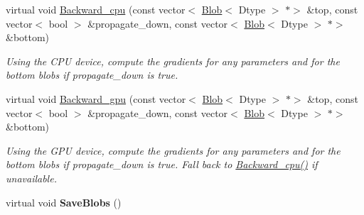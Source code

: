\begin{DoxyCompactItemize}
\mbox{\label{classcaffe_1_1_h_d_f5_output_layer_a43fe8d2ba8baf951c4be596b046ee29f}} 
virtual void \mbox{\hyperlink{classcaffe_1_1_h_d_f5_output_layer_a43fe8d2ba8baf951c4be596b046ee29f}{Backward\+\_\+cpu}} (const vector$<$ \mbox{\hyperlink{classcaffe_1_1_blob}{Blob}}$<$ Dtype $>$ $\ast$$>$ \&top, const vector$<$ bool $>$ \&propagate\+\_\+down, const vector$<$ \mbox{\hyperlink{classcaffe_1_1_blob}{Blob}}$<$ Dtype $>$ $\ast$$>$ \&bottom)
\begin{DoxyCompactList}\small\item\em Using the C\+PU device, compute the gradients for any parameters and for the bottom blobs if propagate\+\_\+down is true. \end{DoxyCompactList}\item 
\mbox{\label{classcaffe_1_1_h_d_f5_output_layer_a7b6f29bc5aaaf64bf90206c01f34ac4f}} 
virtual void \mbox{\hyperlink{classcaffe_1_1_h_d_f5_output_layer_a7b6f29bc5aaaf64bf90206c01f34ac4f}{Backward\+\_\+gpu}} (const vector$<$ \mbox{\hyperlink{classcaffe_1_1_blob}{Blob}}$<$ Dtype $>$ $\ast$$>$ \&top, const vector$<$ bool $>$ \&propagate\+\_\+down, const vector$<$ \mbox{\hyperlink{classcaffe_1_1_blob}{Blob}}$<$ Dtype $>$ $\ast$$>$ \&bottom)
\begin{DoxyCompactList}\small\item\em Using the G\+PU device, compute the gradients for any parameters and for the bottom blobs if propagate\+\_\+down is true. Fall back to \mbox{\hyperlink{classcaffe_1_1_h_d_f5_output_layer_a1acb4098d879c5fb6646ef097ef15713}{Backward\+\_\+cpu()}} if unavailable. \end{DoxyCompactList}\item 
\mbox{\label{classcaffe_1_1_h_d_f5_output_layer_afe05384c9856833ba9897eab825a5da6}} 
virtual void {\bfseries Save\+Blobs} ()
\end{DoxyCompactItemize}
